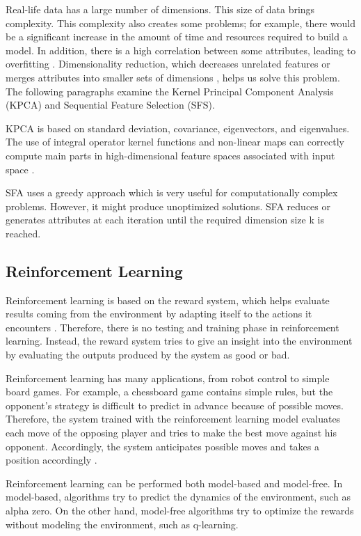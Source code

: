 Real-life data has a large number of dimensions. This size of data brings complexity. This complexity also creates some problems; for example, there would be a significant increase in the amount of time and resources required to build a model. In addition, there is a high correlation between some attributes, leading to overfitting \cite{sonawale2015dimensionality}. Dimensionality reduction, which decreases unrelated features or merges attributes into smaller sets of dimensions \cite{biricik2012comparing}, helps us solve this problem. The following paragraphs examine the Kernel Principal Component Analysis (KPCA) and Sequential Feature Selection (SFS). 

KPCA is based on standard deviation, covariance, eigenvectors, and eigenvalues. The use of integral operator kernel functions and non-linear maps can correctly compute main parts in high-dimensional feature spaces associated with input space \cite{scholkopf1997kernel}.

SFA uses a greedy approach which is very useful for computationally complex problems. However, it might produce unoptimized solutions. SFA reduces or generates attributes at each iteration until the required dimension size k is reached.

\subsection{Reinforcement Learning}

Reinforcement learning is based on the reward system, which helps evaluate results coming from the environment by adapting itself to the actions it encounters  \cite{sutton2018reinforcement}. Therefore, there is no testing and training phase in reinforcement learning. Instead, the reward system tries to give an insight into the environment by evaluating the outputs produced by the system as good or bad.

Reinforcement learning has many applications, from robot control to simple board games. For example, a chessboard game contains simple rules, but the opponent's strategy is difficult to predict in advance because of possible moves. Therefore, the system trained with the reinforcement learning model evaluates each move of the opposing player and tries to make the best move against his opponent. Accordingly, the system anticipates possible moves and takes a position accordingly \cite{alpaydin2020introduction}.

Reinforcement learning can be performed both model-based and model-free. In model-based, algorithms try to predict the dynamics of the environment, such as alpha zero. On the other hand, model-free algorithms try to optimize the rewards without modeling the environment, such as q-learning.

